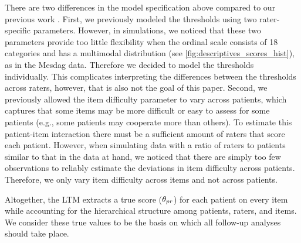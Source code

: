 \documentclass[a4paper,11pt]{article}
\newcommand{\DB}[1]{\todo[inline, color=colorDon]{DB: {#1}}}
\begin{document}
There are two differences in the model specification above compared to our previous work \parencite{vandenBergh2020cultural}.
First, we previously modeled the thresholds using two rater-specific parameters.
However, in simulations, we noticed that these two parameters provide too little flexibility when the ordinal scale consists of 18 categories and has a multimodal distribution (see \autoref{fig:descriptives_scores_hist}), as in the Mesdag data.
Therefore we decided to model the thresholds individually.
This complicates interpreting the differences between the thresholds across raters, however, that is also not the goal of this paper.
Second, we previously allowed the item difficulty parameter to vary across patients, which captures that some items may be more difficult or easy to assess for some patients (e.g., some patients may cooperate more than others).
To estimate this patient-item interaction there must be a sufficient amount of raters that score each patient.
However, when simulating data with a ratio of raters to patients similar to that in the data at hand, we noticed that there are simply too few observations to reliably estimate the deviations in item difficulty across patients.
Therefore, we only vary item difficulty across items and not across patients.

Altogether, the LTM extracts a true score ($\theta_{pr}$) for each patient on every item while accounting for the hierarchical structure among patients, raters, and items.
We consider these true values to be the basis on which all follow-up analyses should take place.%



%
%
%
%
%
\end{document}
